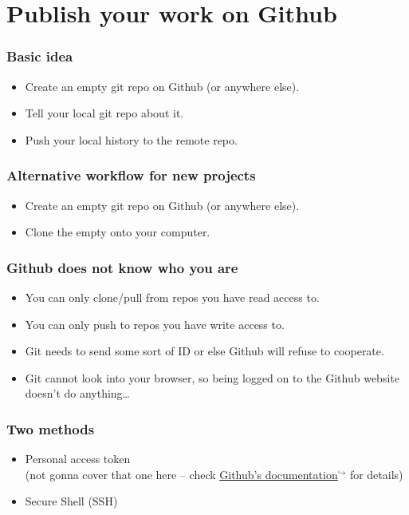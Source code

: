 \documentclass[12pt]{beamer}
\begin{document}


\section{Publish your work on Github}

\begin{frame}
  \frametitle{Basic idea}

  \begin{itemize}
    \item Create an empty git repo on Github (or anywhere else).
    \item Tell your local git repo about it.
    \item Push your local history to the remote repo.
  \end{itemize}
\end{frame}

\begin{frame}
  \frametitle{Alternative workflow for new projects}

  \begin{itemize}
    \item Create an empty git repo on Github (or anywhere else).
    \item Clone the empty onto your computer.
  \end{itemize}
\end{frame}

\begin{frame}
  \frametitle{Github does not know who you are}

  \begin{itemize}
    \item You can only clone/pull from repos you have read access to.
    \item You can only push to repos you have write access to.
    \item Git needs to send some sort of ID or else Github will refuse to
      cooperate.
    \item Git cannot look into your browser, so being logged on to the Github
      website doesn't do anything\dots{}
  \end{itemize}
\end{frame}

\begin{frame}
  \frametitle{Two methods}

  \begin{itemize}
    \item Personal access token\\
      (not gonna cover that one here -- check
      \href{https://docs.github.com/en/github/authenticating-to-github/keeping-your-account-and-data-secure/creating-a-personal-access-token#creating-a-token}%
      {Github's documentation$^{\hookrightarrow}$} for details)
    \item Secure Shell (SSH)
  \end{itemize}
\end{frame}
\end{document}
